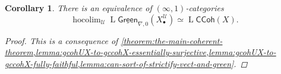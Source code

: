 \documentclass[11pt,fleqn]{article}
\theoremstyle{plain}
\newtheorem{corollary}[theorem]{Corollary}
\theoremstyle{definition}
\theoremstyle{remark}
\numberwithin{equation}{theorem}
\newcommand{\cover}{\mathcal{U}}
\newcommand{\gccohX}{\mathsf{CCoh}(X)}
\newcommand{\sgreenzeroX}{\underline{\mathsf{Green}}_{\nabla,0}(X_\bullet^\cover)}
\DeclareMathOperator{\LL}{L}
\DeclareMathOperator{\hocolim}{hocolim}
\begin{document}
        \begin{corollary}\label{corollary:the-main-coherent-corollary}
            There is an equivalence of $(\infty,1)$-categories
            \begin{equation*}
                \hocolim_\cover\LL{\sgreenzeroX} \simeq \LL{\gccohX}.
            \end{equation*}
            \begin{proof}
                This is a consequence of \cref{theorem:the-main-coherent-theorem,lemma:gcohUX-to-gccohX-essentially-surjective,lemma:gcohUX-to-gccohX-fully-faithful,lemma:can-sort-of-strictify-vect-and-green}.
            \end{proof}
        \end{corollary}


\printbibliography
\end{document}
